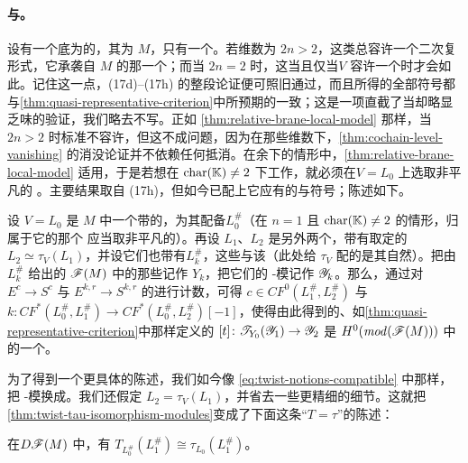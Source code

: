 \paragraph{\trAlgebraicTwisting{}与\trGeometricTwisting。}\label{sub:algebraic-geometric-twisting}
设有一个底为\trDisk{}的\trLefschetzFibration，其\trFiber{}为 $M$，只有一个\trCriticalPoint。若\trFiber{}维数为 $2n>2$，这类\trFibration{}总容许一个\trRelative{}二次复\trVolume{}形式，它承袭自 $M$ 的那一个；而当 $2n=2$ 时，这当且仅当\trVanishingCycle{}$V$ 容许一个\trGrading{}时才会如此。记住这一点，(17d)–(17h) 的整段论证便可照旧通过，而且所得的全部符号都与\cref{thm:quasi-representative-criterion}中所预期的一致；这是一项直截了当却略显乏味的验证，我们略去不写。正如 \cref{thm:relative-brane-local-model} 那样，当 $2n>2$ 时标准\trBoundaryCondition{}不容许\trRelative\trGrading，但这不成问题，因为在那些维数下，\cref{thm:cochain-level-vanishing} 的消没论证并不依赖任何抵消。在余下的情形中，\cref{thm:relative-brane-local-model} 适用，于是若想在 $\mathrm{char}(\mathbb{K})\neq 2$ 下工作，就必须在\trVanishingCycle{}$V=L_0$ 上选取非平凡的 \trPinStructure。主要结果取自 (17h)，但如今已配上它应有的\trGrading{}与符号；陈述如下。
\begin{theorem}\label{thm:twist-tau-isomorphism-modules}
设 $V=L_0$ 是 $M$ 中一个带\trFrame{}的\trExact\trLagrange\trSphere，为其配备\trBraneStructure{}$L^{\#}_0$（在 $n=1$ 且 $\mathrm{char}(\mathbb{K})\neq 2$ 的情形，归属于它的那个 \trPinStructure{}应当取非平凡的）。再设 $L_1$、$L_2$ 是另外两个\trExact\trLagrange\trSubmanifold，带有取定的\trIsotopy{}$L_2\simeq\tau_V(L_1)$，并设它们也带有\trBraneStructure{}$L^{\#}_k$，这些\trBraneStructure{}与该\trIsotopy\trCompatible（此处给 $\tau_V$ 配的是其自然\trGrading）。把由 $L^{\#}_k$ 给出的 $\mathscr{F}(M)$ 中的那些\trObject{}记作 $Y_k$，把它们的\trYoneda{} \trAinfty-模记作 $\mathscr{Y}_k$。那么，通过对\trFibration{}$E^c\to S^c$ 与 $E^{k,r}\to S^{k,r}$ 的\trSection{}进行计数，可得 $c\in CF^0(L^{\#}_1,L^{\#}_2)$ 与 $k\colon CF^*(L^{\#}_0,L^{\#}_1)\to CF^*(L^{\#}_0,L^{\#}_2)[-1]$，使得由此得到的、如\cref{thm:quasi-representative-criterion}中那样定义的 $[t]\colon\mathscr{T}_{Y_0}(\mathscr{Y}_1)\to\mathscr{Y}_2$ 是 $H^0(\mathit{mod}(\mathscr{F}(M)))$ 中的一个\trIsomorphism。
\end{theorem}
\noqed
为了得到一个更具体的陈述，我们如今像 \eqref{eq:twist-notions-compatible} 中那样，把 \trAinfty-模换成\trTwistedComplex。我们还假定 $L_2=\tau_V(L_1)$，并省去一些更精细的细节。这就把\cref{thm:twist-tau-isomorphism-modules}变成了下面这条“$T=\tau$”的陈述：
\begin{corollary}\label{thm:twist-equals-tau}
在\trDerivedCategory{}$D\mathscr{F}(M)$ 中，有 $T_{L^{\#}_0}(L^{\#}_1)\cong\tau_{L_0}(L^{\#}_1)$。
\end{corollary}
